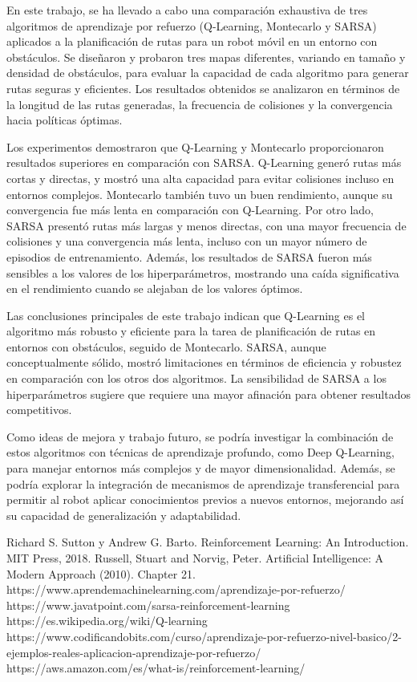 \documentclass[conference,a4paper]{IEEEtran}
\begin{document}
En este trabajo, se ha llevado a cabo una comparación exhaustiva de tres algoritmos de aprendizaje por refuerzo (Q-Learning, Montecarlo y SARSA) aplicados a la planificación de rutas para un robot móvil en un entorno con obstáculos.
Se diseñaron y probaron tres mapas diferentes, variando en tamaño y densidad de obstáculos, para evaluar la capacidad de cada algoritmo para generar rutas seguras y eficientes. Los resultados obtenidos se analizaron 
en términos de la longitud de las rutas generadas, la frecuencia de colisiones y la convergencia hacia políticas óptimas.\newline

Los experimentos demostraron que Q-Learning y Montecarlo proporcionaron resultados superiores en comparación con SARSA. Q-Learning generó rutas más cortas y directas, y mostró una alta 
capacidad para evitar colisiones incluso en entornos complejos. Montecarlo también tuvo un buen rendimiento, aunque su convergencia fue más lenta en comparación con Q-Learning. Por otro lado,
SARSA presentó rutas más largas y menos directas, con una mayor frecuencia de colisiones y una convergencia más lenta, incluso con un mayor número de episodios de entrenamiento.
Además, los resultados de SARSA fueron más sensibles a los valores de los hiperparámetros, mostrando una caída significativa en el rendimiento cuando se alejaban de los valores óptimos.\newline

Las conclusiones principales de este trabajo indican que Q-Learning es el algoritmo más robusto y eficiente para la tarea de planificación de rutas en entornos con obstáculos, seguido de Montecarlo. 
SARSA, aunque conceptualmente sólido, mostró limitaciones en términos de eficiencia y robustez en comparación con los otros dos algoritmos. La sensibilidad de SARSA a los hiperparámetros sugiere que 
requiere una mayor afinación para obtener resultados competitivos.\newline

Como ideas de mejora y trabajo futuro, se podría investigar la combinación de estos algoritmos con técnicas de aprendizaje profundo, como Deep Q-Learning, para manejar entornos más complejos y
de mayor dimensionalidad. Además, se podría explorar la integración de mecanismos de aprendizaje transferencial para permitir al robot aplicar conocimientos previos a nuevos entornos, mejorando
así su capacidad de generalización y adaptabilidad.

  \begin{thebibliography}{99}
   Richard S. Sutton y Andrew G. Barto. Reinforcement Learning: An Introduction.
  MIT Press, 2018.
    Russell, Stuart and Norvig, Peter. Artificial Intelligence: A Modern Approach
  (2010). Chapter 21.
   https://www.aprendemachinelearning.com/aprendizaje-por-refuerzo/
   https://www.javatpoint.com/sarsa-reinforcement-learning
   https://es.wikipedia.org/wiki/Q-learning
   https://www.codificandobits.com/curso/aprendizaje-por-refuerzo-nivel-basico/2-ejemplos-reales-aplicacion-aprendizaje-por-refuerzo/
   https://aws.amazon.com/es/what-is/reinforcement-learning/

  \end{thebibliography}


  
\end{document}
